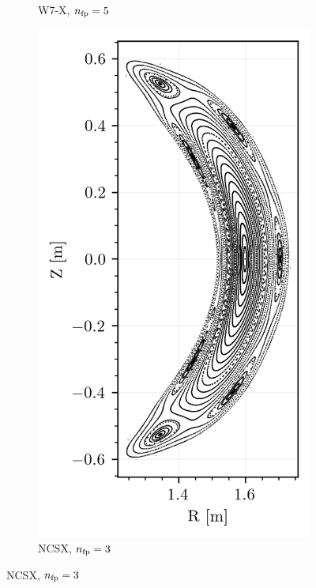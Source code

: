 \begin{figure}[H]
\begin{subfigure}[c]{0.32\textwidth}
        \caption{W7-X, $n_\text{fp} = 5$}
        \label{fig:w7x-default}
    \end{subfigure}
    \hfill
    \begin{subfigure}[c]{0.32\textwidth}
        \centering
        \includegraphics[width=\textwidth]{images/theory/ncsx.png}
        \caption{NCSX, $n_\text{fp} = 3$}
        \label{fig:ncsx-default}
    \end{subfigure}

\end{figure}
